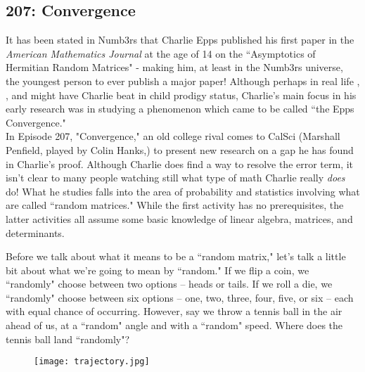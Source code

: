 \newpage
\subsection{207: Convergence}\label{207}

It has been stated in Numb3rs that Charlie Epps published his first paper in the \emph{American Mathematics Journal} at the age of 14 on the ``Asymptotics of Hermitian Random Matrices" - making him, at least in the Numb3rs universe, the youngest person to ever publish a major paper! Although perhaps in real life , , and  might have Charlie beat in child prodigy status, Charlie's main focus in his early research was in studying a phenomenon which came to be called ``the Epps Convergence." \\

In Episode 207, "Convergence," an old college rival comes to CalSci (Marshall Penfield, played by Colin Hanks,) to present new research on a gap he has found in Charlie's proof. Although Charlie does find a way to resolve the error term, it isn't clear to many people watching still what type of math Charlie really \emph{does} do! What he studies falls into the area of probability and statistics involving what are called ``random matrices." While the first activity has no prerequisites, the latter activities all assume some basic knowledge of linear algebra, matrices, and determinants. \\


Before we talk about what it means to be a ``random matrix," let's talk a little bit about what we're going to mean by ``random." If we flip a coin, we ``randomly" choose between two options -- heads or tails. If we roll a die, we ``randomly" choose between six options -- one, two, three, four, five, or six -- each with equal chance of occurring. However, say we throw a tennis ball in the air ahead of us, at a ``random" angle and with a ``random" speed. Where does the tennis ball land ``randomly"? \\

\begin{figure}[H]
   \centering
   \texttt{[image: trajectory.jpg]} 
\end{figure}

